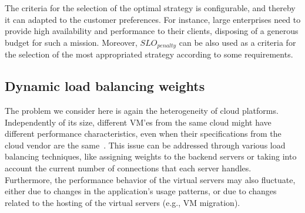 The criteria for the selection of the optimal strategy is configurable, and thereby it can adapted to the customer preferences. For instance, large enterprises need to provide high availability and performance to their clients, disposing of a generous budget for such a mission. Moreover, \emph{$SLO_{penalty}$} can be also used as a criteria for the selection of the most appropriated strategy according to some requirements.





\subsection{Dynamic load balancing weights } 


The problem we consider here is again the heterogeneity of cloud platforms.
Independently of its size, different VM'es from the same cloud might have different performance
characteristics, even when their specifications from the cloud vendor are 
the same~\cite{ec2Performance}. This issue can be addressed through various 
load balancing techniques, like assigning weights to the backend servers or 
taking into account the current number of connections that each server 
handles. Furthermore, the performance behavior of the virtual servers may 
also fluctuate, either due to changes in the application's usage 
patterns, or due to changes related to the hosting of the virtual servers 
(e.g., VM migration).



